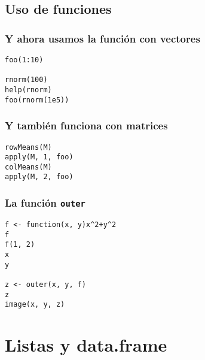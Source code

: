 \documentclass[bigger]{beamer}
\begin{document}
\subsection{Uso de funciones}
\label{sec-3-2}
\begin{frame}[fragile]
\frametitle{Y ahora usamos la función con vectores}
\label{sec-3-2-1}


\lstset{language=R}
\begin{lstlisting}
foo(1:10)

rnorm(100)
help(rnorm)
foo(rnorm(1e5))
\end{lstlisting}
\end{frame}
\begin{frame}[fragile]
\frametitle{Y también funciona con matrices}
\label{sec-3-2-2}


\lstset{language=R}
\begin{lstlisting}
rowMeans(M)
apply(M, 1, foo)
colMeans(M)
apply(M, 2, foo)
\end{lstlisting}
\end{frame}
\begin{frame}[fragile]
\frametitle{La función \texttt{outer}}
\label{sec-3-2-3}


\lstset{language=R}
\begin{lstlisting}
f <- function(x, y)x^2+y^2
f
f(1, 2)
x
y

z <- outer(x, y, f)
z
image(x, y, z)
\end{lstlisting}
\end{frame}
\section{Listas y data.frame}
\label{sec-4}
\end{document}
